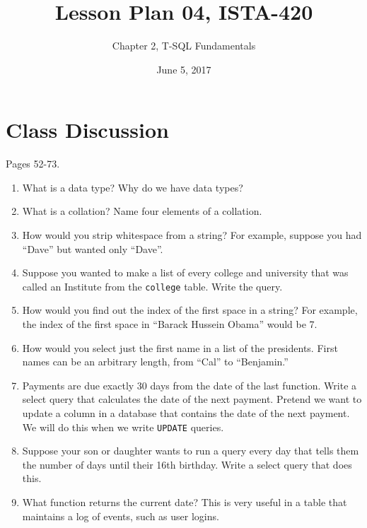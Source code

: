 \documentclass{article}
\title{Lesson Plan 04, ISTA-420}
\author{Chapter 2, T-SQL Fundamentals}
\date{June 5, 2017}
\begin{document}
    

    \maketitle{}

    \section{Class Discussion}

    Pages 52-73.

    \begin{enumerate}

        \item What is a data type? Why do we have data types?
        \item What is a collation? Name four elements of a collation.
        \item How would you strip whitespace from a string? For example, suppose you had ``\textvisiblespace{}\textvisiblespace{}\textvisiblespace{}\textvisiblespace{}Dave\textvisiblespace{}\textvisiblespace{}\textvisiblespace{}\textvisiblespace{}'' but wanted only ``Dave''. 
        \item Suppose you wanted to make a list of every college and university that was called an Institute from the \texttt{college} table. Write the query.
        \item How would you find out the index of the first space in a string? For example, the index of the first space in ``Barack Hussein Obama'' would be 7.
        \item How would you select just the first name in a list of the presidents. First names can be an arbitrary length, from ``Cal'' to ``Benjamin.''
        \item Payments are due exactly 30 days from the date of the last function. Write a select query that calculates the date of the next payment. Pretend we want to update a column in a database that contains the date of the next payment. We will do this when we write \texttt{UPDATE} queries. 
        \item Suppose your son or daughter wants to run a query every day that tells them the number of days until their 16th birthday. Write a select query that does this.
        \item What function returns the current date? This is very useful in a table that maintains a log of events, such as user logins.

    \end{enumerate}
\end{document}
